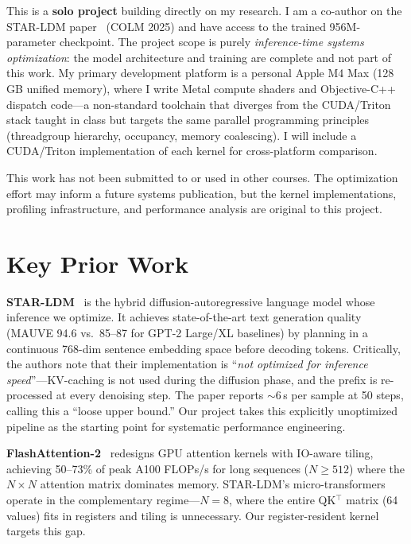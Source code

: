 \documentclass[sigconf,authordraft]{acmart}
\begin{document}
This is a \textbf{solo project} building directly on my research. I am a co-author on the STAR-LDM paper~\cite{lovelace2025star} (COLM 2025) and have access to the trained 956M-parameter checkpoint. The project scope is purely \textit{inference-time systems optimization}: the model architecture and training are complete and not part of this work. My primary development platform is a personal Apple M4 Max (128\,GB unified memory), where I write Metal compute shaders and Objective-C++ dispatch code---a non-standard toolchain that diverges from the CUDA/Triton stack taught in class but targets the same parallel programming principles (threadgroup hierarchy, occupancy, memory coalescing). I will include a CUDA/Triton implementation of each kernel for cross-platform comparison.

This work has not been submitted to or used in other courses. The optimization effort may inform a future systems publication, but the kernel implementations, profiling infrastructure, and performance analysis are original to this project.

\section{Key Prior Work}

\textbf{STAR-LDM}~\cite{lovelace2025star} is the hybrid diffusion-autoregressive language model whose inference we optimize. It achieves state-of-the-art text generation quality (MAUVE 94.6 vs.\ 85--87 for GPT-2 Large/XL baselines) by planning in a continuous 768-dim sentence embedding space before decoding tokens. Critically, the authors note that their implementation is ``\textit{not optimized for inference speed}''---KV-caching is not used during the diffusion phase, and the prefix is re-processed at every denoising step. The paper reports ${\sim}$6\,s per sample at 50 steps, calling this a ``loose upper bound.'' Our project takes this explicitly unoptimized pipeline as the starting point for systematic performance engineering.

\textbf{FlashAttention-2}~\cite{dao2024flashattention2} redesigns GPU attention kernels with IO-aware tiling, achieving 50--73\% of peak A100 FLOPs/s for long sequences ($N \geq 512$) where the $N \times N$ attention matrix dominates memory. STAR-LDM's micro-transformers operate in the complementary regime---$N{=}8$, where the entire QK$^\top$ matrix (64 values) fits in registers and tiling is unnecessary. Our register-resident kernel targets this gap.
\end{document}
